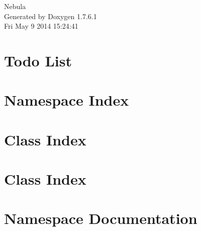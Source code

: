 \documentclass[a4paper]{book}
\begin{document}
\hypersetup{pageanchor=false,citecolor=blue}
\begin{titlepage}
\vspace*{7cm}
\begin{center}
{\Large \-Nebula }\\
\vspace*{1cm}
{\large \-Generated by Doxygen 1.7.6.1}\\
\vspace*{0.5cm}
{\small Fri May 9 2014 15:24:41}\\
\end{center}
\end{titlepage}
\clearemptydoublepage
{}
\tableofcontents
\clearemptydoublepage
{}
\hypersetup{pageanchor=true,citecolor=blue}
\chapter{\-Todo \-List}
\label{todo}
\hypertarget{todo}{}

\chapter{\-Namespace \-Index}

\chapter{\-Class \-Index}

\chapter{\-Class \-Index}

\chapter{\-Namespace \-Documentation}
















\end{document}
